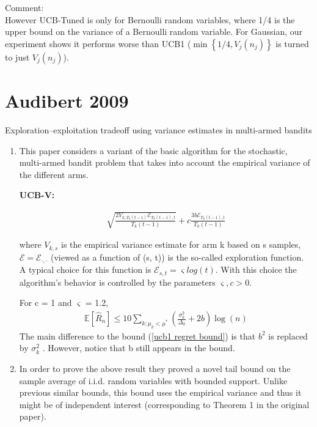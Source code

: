 \documentclass{article}
\begin{document}
Comment:\\
However UCB-Tuned is only for Bernoulli random variables, where 1/4 is the upper bound on the variance of a Bernoulli random variable. For Gaussian, our experiment shows it performs worse than UCB1 ($ \min \left\{1 / 4, V_{j}\left(n_{j}\right)\right\}$ is turned to just $V_{j}\left(n_{j}\right)$). 

\section{Audibert 2009}

Exploration–exploitation tradeoff using variance estimates in multi-armed bandits \cite{AUDIBERT20091876}

\begin{enumerate}
    \item This paper considers a variant of the basic algorithm for the stochastic, multi-armed bandit problem that takes into account the empirical variance of the different arms. 
    
    \textbf{UCB-V:}
    
    \begin{align}
        \sqrt{\frac{2 V_{k, T_{k}(t-1)} \mathcal{E}_{T_{k}(t-1), t}}{T_{k}(t-1)}}+c \frac{3 b \mathcal{E}_{T_{k}(t-1), t}}{T_{k}(t-1)}
    \end{align}
    
    where $V_{k,s}$ is the empirical variance estimate for arm k based on s samples,
    $\mathcal{E} = \mathcal{E}_{\cdot,\cdot}$ (viewed as a function of (s, t)) is the so-called exploration function. A typical choice for this function is $\mathcal{E}_{s,t} = \varsigma log(t)$. With this choice the algorithm’s behavior is controlled by the parameters $\varsigma, c > 0$.
    
    For c = 1 and $\varsigma$ = 1.2, 
    \begin{align}
        \mathbb{E}\left[\hat{R}_{n}\right] \leq 10 \sum_{k : \mu_{k}<\mu^{*}}\left(\frac{\sigma_{k}^{2}}{\Delta_{k}}+2 b\right) \log (n)
    \end{align}
    The main difference to the bound (\ref{ucb1 regret bound}) is that $b^2$ is replaced by $\sigma_k^2$ . However, notice that b still appears in the bound.
    
    \item In order to prove the above result they proved a novel tail bound on the sample average of i.i.d. random variables with bounded support. Unlike previous similar bounds, this bound uses the empirical variance and thus it might be of independent interest (corresponding to Theorem 1 in the original paper).
    

\end{enumerate}
\end{document}

